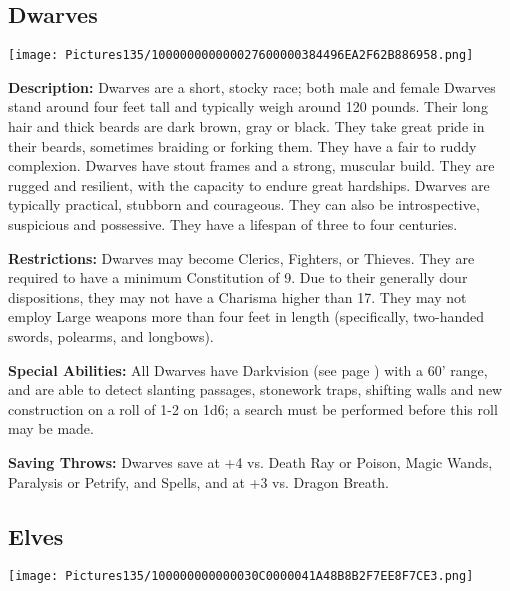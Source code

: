 \documentclass[a4paper,twoside,openany,10pt]{book}
\begin{document}
\begin{multicols}{2}
	

\subsection{Dwarves}\label{dwarves}

\begin{center}
	\texttt{[image: Pictures135/100000000000027600000384496EA2F62B886958.png]}
\end{center}

\textbf{Description: } Dwarves are a short, stocky race; both male and female Dwarves stand around four feet tall and typically weigh around 120 pounds. Their long hair and thick beards are dark brown, gray or black. They take great pride in their beards, sometimes braiding or forking them. They have a fair to ruddy complexion. Dwarves have stout frames and a strong, muscular build. They are rugged and resilient, with the capacity to endure great hardships. Dwarves are typically practical, stubborn and courageous. They can also be introspective, suspicious and possessive. They have a lifespan of three to four centuries.

\textbf{Restrictions: } Dwarves may become Clerics, Fighters, or Thieves. They are required to have a minimum Constitution of 9. Due to their generally dour dispositions, they may not have a Charisma higher than 17. They may not employ Large weapons more than four feet in length (specifically, two-handed swords, polearms, and longbows).

\textbf{Special Abilities:} All Dwarves have Darkvision (see page \hyperlink{darkvision}{\pageref{darkvision}}) with a 60'{} range, and are able to detect slanting passages, stonework traps, shifting walls and new construction on a roll of 1-2 on 1d6; a search must be performed before this roll may be made.

\textbf{Saving Throws: } Dwarves save at +4 vs. Death Ray or Poison, Magic Wands, Paralysis or Petrify, and Spells, and at +3 vs. Dragon Breath.

\columnbreak

\subsection{Elves}\label{elves}

\begin{center}
	\texttt{[image: Pictures135/100000000000030C0000041A48B8B2F7EE8F7CE3.png]}
\end{center}


\end{multicols}
\end{document}
